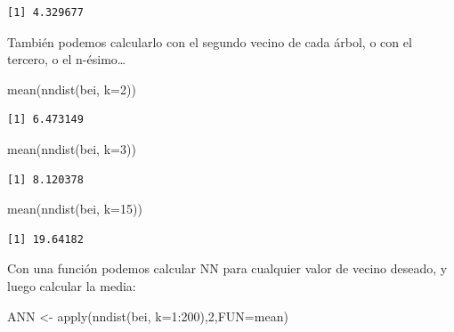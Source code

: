 \documentclass[
  letterpaper,
  DIV=11,
  numbers=noendperiod]{scrreprt}
\newenvironment{Shaded}{\begin{snugshade}}{\end{snugshade}}
\newcommand{\AttributeTok}[1]{\textcolor[rgb]{0.40,0.45,0.13}{#1}}
\newcommand{\DecValTok}[1]{\textcolor[rgb]{0.68,0.00,0.00}{#1}}
\newcommand{\FunctionTok}[1]{\textcolor[rgb]{0.28,0.35,0.67}{#1}}
\newcommand{\NormalTok}[1]{\textcolor[rgb]{0.00,0.23,0.31}{#1}}
\newcommand{\OtherTok}[1]{\textcolor[rgb]{0.00,0.23,0.31}{#1}}
\newcommand{\SpecialCharTok}[1]{\textcolor[rgb]{0.37,0.37,0.37}{#1}}
\begin{document}
\begin{verbatim}
[1] 4.329677
\end{verbatim}

También podemos calcularlo con el segundo vecino de cada árbol, o con el
tercero, o el n-ésimo\ldots{}

\begin{Shaded}
\begin{Highlighting}[]
\FunctionTok{mean}\NormalTok{(}\FunctionTok{nndist}\NormalTok{(bei, }\AttributeTok{k=}\DecValTok{2}\NormalTok{))}
\end{Highlighting}
\end{Shaded}

\begin{verbatim}
[1] 6.473149
\end{verbatim}

\begin{Shaded}
\begin{Highlighting}[]
\FunctionTok{mean}\NormalTok{(}\FunctionTok{nndist}\NormalTok{(bei, }\AttributeTok{k=}\DecValTok{3}\NormalTok{))}
\end{Highlighting}
\end{Shaded}

\begin{verbatim}
[1] 8.120378
\end{verbatim}

\begin{Shaded}
\begin{Highlighting}[]
\FunctionTok{mean}\NormalTok{(}\FunctionTok{nndist}\NormalTok{(bei, }\AttributeTok{k=}\DecValTok{15}\NormalTok{))}
\end{Highlighting}
\end{Shaded}

\begin{verbatim}
[1] 19.64182
\end{verbatim}

Con una función podemos calcular NN para cualquier valor de vecino
deseado, y luego calcular la media:

\begin{Shaded}
\begin{Highlighting}[]
\NormalTok{ANN }\OtherTok{\textless{}{-}} \FunctionTok{apply}\NormalTok{(}\FunctionTok{nndist}\NormalTok{(bei, }\AttributeTok{k=}\DecValTok{1}\SpecialCharTok{:}\DecValTok{200}\NormalTok{),}\DecValTok{2}\NormalTok{,}\AttributeTok{FUN=}\NormalTok{mean)}
\end{Highlighting}
\end{Shaded}
\end{document}
